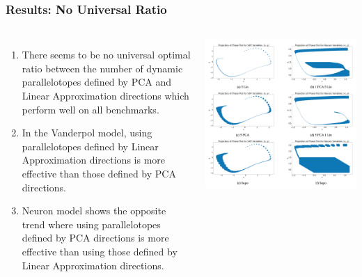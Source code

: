 \documentclass{beamer}
\begin{document}
\begin{frame}
  \frametitle{\textbf{Results:}  No Universal Ratio}
  \begin{columns}
      \footnotesize
        \begin{enumerate}
          \item There seems to be no universal optimal ratio between the number of dynamic parallelotopes defined by PCA and Linear Approximation directions which perform well on all benchmarks.
          \item In the Vanderpol model, using parallelotopes defined by Linear Approximation directions is more effective than those defined by PCA directions.
          \item Neuron model shows the opposite trend where using parallelotopes defined by PCA directions is more effective than using those defined by Linear Approximation directions.
        \end{enumerate}
        \includegraphics[width=1.15\textwidth]{universalplot}
  \end{columns}
\end{frame}
\end{document}
